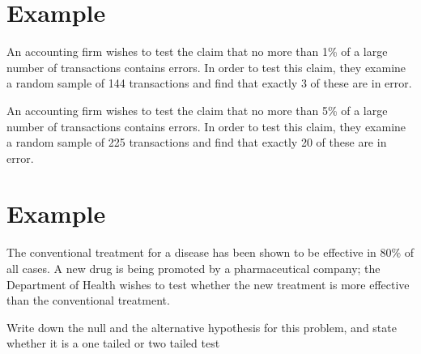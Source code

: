 
\section{Example}

An accounting firm wishes to test the claim that no more than 1\% of a large
number of transactions contains errors. In order to test this claim, they
examine a random sample of 144 transactions and find that exactly 3 of
these are in error.

An accounting firm wishes to test the claim that no more than 5\% of a large
number of transactions contains errors. In order to test this claim, they examine a
random sample of 225 transactions and find that exactly 20 of these are in error.

\section{Example}


The conventional treatment for a disease has been shown to be effective in
80\% of all cases. A new drug is being promoted by a pharmaceutical
company; the Department of Health wishes to test whether the new treatment
is more effective than the conventional treatment.

Write down the null and the alternative hypothesis for this problem, and state whether it is a one tailed or two tailed test

